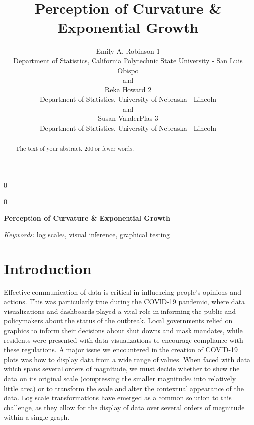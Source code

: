 \documentclass[12pt]{article}
\newcommand{\blind}{0}
\begin{document}
\def\spacingset#1{\renewcommand{\baselinestretch}%
{#1}\small\normalsize} \spacingset{1}



\blind
{
  \title{\bf Perception of Curvature \& Exponential Growth}

  \author{
        Emily A. Robinson 1 \\
    Department of Statistics, California Polytechnic State University -
San Luis Obispo\\
     and \\     Reka Howard 2 \\
    Department of Statistics, University of Nebraska - Lincoln\\
     and \\     Susan VanderPlas 3 \\
    Department of Statistics, University of Nebraska - Lincoln\\
      }
  \maketitle
} \fi

\blind
{
  \bigskip
  \bigskip
  \bigskip
  \begin{center}
    {\LARGE\bf Perception of Curvature \& Exponential Growth}
  \end{center}
  \medskip
} \fi

\bigskip
\begin{abstract}
The text of your abstract. 200 or fewer words.
\end{abstract}

\noindent%
{\it Keywords:} log scales, visual inference, graphical testing
\vfill

\newpage
\spacingset{1.45} %

\hypertarget{introduction}{%
\section{Introduction}\label{introduction}}

Effective communication of data is critical in influencing people's
opinions and actions. This was particularly true during the COVID-19
pandemic, where data visualizations and dashboards played a vital role
in informing the public and policymakers about the status of the
outbreak. Local governments relied on graphics to inform their decisions
about shut downs and mask mandates, while residents were presented with
data visualizations to encourage compliance with these regulations. A
major issue we encountered in the creation of COVID-19 plots was how to
display data from a wide range of values. When faced with data which
spans several orders of magnitude, we must decide whether to show the
data on its original scale (compressing the smaller magnitudes into
relatively little area) or to transform the scale and alter the
contextual appearance of the data. Log scale transformations have
emerged as a common solution to this challenge, as they allow for the
display of data over several orders of magnitude within a single graph.
\end{document}
